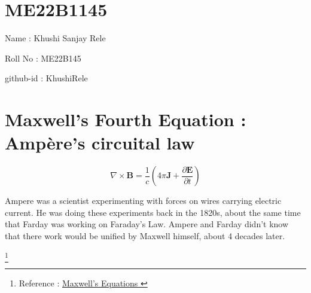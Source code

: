 \section{ME22B1145}

 Name : Khushi Sanjay Rele

Roll No : ME22B145

github-id : KhushiRele

\section{Maxwell's Fourth Equation : Ampère's circuital law }

\begin{equation}
    \nabla \times \mathbf{B} = \frac{1}{c} ( 4\pi \mathbf{J} + \frac{\partial \mathbf{E}}{\partial t} )
    \label{eq4}
\end{equation}

Ampere was a scientist experimenting with forces on wires carrying electric current. He was doing these experiments back in the 1820s, about the same time that Farday was working on Faraday's Law. Ampere and Farday didn't know that there work would be unified by Maxwell himself, about 4 decades later.

\footnote{
Reference : \href{https://www.maxwells-equations.com/ampere/amperes-law.php}{ Maxwell's Equations }
}




